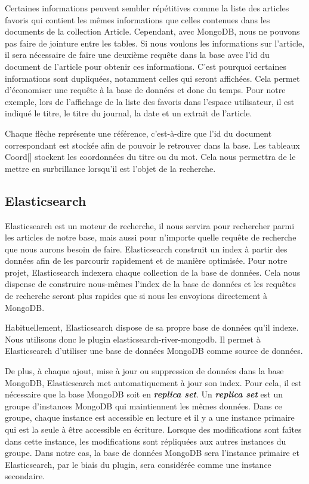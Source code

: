 Certaines informations peuvent sembler répétitives comme la liste des articles favoris qui contient les mêmes informations que celles contenues dans les documents de la collection Article. Cependant, avec MongoDB, nous ne pouvons pas faire de jointure entre les tables. Si nous voulons les informations sur l’article, il sera nécessaire de faire une deuxième requête dans la base avec l’id du document de l’article pour obtenir ces informations. C’est pourquoi certaines informations sont dupliquées, notamment celles qui seront affichées. Cela permet d'économiser une requête à la base de données et donc du temps. Pour notre exemple, lors de l’affichage de la liste des favoris dans l’espace utilisateur, il est indiqué le titre, le titre du journal, la date et un extrait de l’article. 


Chaque flèche représente une référence, c’est-à-dire que l’id du document correspondant est stockée afin de pouvoir le retrouver dans la base. Les tableaux Coord[] stockent les coordonnées du  titre ou du mot. Cela nous permettra de le mettre en surbrillance lorsqu’il est l’objet de la recherche. 

\subsection{Elasticsearch}

Elasticsearch est un moteur de recherche, il nous servira pour rechercher parmi les articles de notre base, mais aussi pour n'importe quelle requête de recherche que nous aurons besoin de faire. Elasticsearch construit un index à partir des données afin de les parcourir rapidement et de manière optimisée. Pour notre projet, Elasticsearch indexera chaque collection de la base de données.  Cela nous dispense de construire nous-mêmes l'index de la base de données et les requêtes de recherche seront plus rapides que si nous les envoyions directement à MongoDB.


Habituellement, Elasticsearch dispose de sa propre base de données qu’il indexe. Nous utilisons donc le plugin elasticsearch-river-mongodb\cite{GitRiver}. Il permet à Elasticsearch d’utiliser une base de données MongoDB comme source de données. 


De plus, à chaque ajout, mise à jour ou suppression de données dans la base MongoDB, Elasticsearch met automatiquement à jour son index. Pour cela, il est nécessaire que la base MongoDB soit en \textbf{\textit{replica set}}.  Un \textbf{\textit{replica set}} est un groupe d’instances MongoDB qui maintiennent les mêmes données. Dans ce groupe, chaque instance est accessible en lecture et il y a une instance primaire qui est la seule à être accessible en écriture. Lorsque des modifications sont faîtes dans cette instance, les modifications sont répliquées aux autres instances du groupe. Dans notre cas, la base de données MongoDB sera l’instance primaire et Elasticsearch, par le biais du plugin, sera considérée comme une instance secondaire. 

